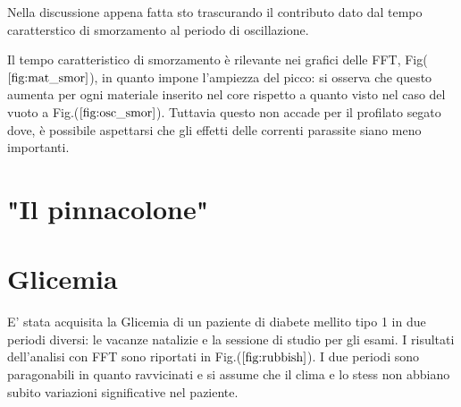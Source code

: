 \documentclass{article}
\begin{document}
        Nella discussione appena fatta sto trascurando il contributo dato dal 
        tempo caratterstico di smorzamento al periodo di oscillazione.
        
        Il tempo caratteristico di smorzamento è rilevante nei grafici 
        delle FFT, Fig($\ref{fig:mat_smor}$), in quanto impone l'ampiezza del picco:
        si osserva che questo aumenta per ogni materiale inserito nel core 
        rispetto a quanto visto nel caso  del vuoto a Fig.($\ref{fig:osc_smor}$).
        Tuttavia questo non accade per il profilato segato dove, è possibile  
        aspettarsi che gli effetti delle correnti parassite siano meno importanti.

        





\section{"Il pinnacolone"}

\section{Glicemia}

        E' stata acquisita la Glicemia di un paziente di diabete mellito tipo 1 in 
        due periodi diversi: le vacanze natalizie e la sessione di studio per gli esami.
        I risultati dell'analisi con FFT sono riportati in Fig.($\ref{fig:rubbish}$).
        I due periodi sono paragonabili in quanto ravvicinati e si assume che
        il clima e lo stess non abbiano subito variazioni significative 
        nel paziente.
        
\end{document}
